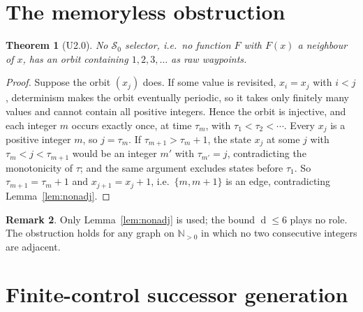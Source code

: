 \documentclass[11pt]{article}
\newtheorem{theorem}{Theorem}[section]
\theoremstyle{definition}
\newtheorem{remark}[theorem]{Remark}
\newcommand{\N}{\mathbb{N}}
\newcommand{\dist}{\operatorname{d}}
\begin{document}
\section{The memoryless obstruction}\label{sec:obstruction}
\begin{theorem}[U2.0]\label{thm:u20}
No $\mathcal S_0$ selector, i.e.\ no function $F$ with $F(x)$ a neighbour of $x$, has an orbit containing $1,2,3,\dots$ as raw waypoints.
\end{theorem}
\begin{proof} Suppose the orbit $(x_j)$ does. If some value is revisited, $x_i=x_j$ with $i<j$, determinism makes the orbit eventually periodic, so it takes only
finitely many values and cannot contain all positive integers. Hence the orbit is injective, and each integer $m$ occurs exactly once, at time $\tau_m$, with
$\tau_1<\tau_2<\cdots$. Every $x_j$ is a positive integer $m$, so $j=\tau_m$. If $\tau_{m+1}>\tau_m+1$, the state $x_j$ at some $j$ with $\tau_m<j<\tau_{m+1}$ would be an integer $m'$ with $\tau_{m'}=j$, contradicting the monotonicity of
$\tau$; and the same argument excludes states before $\tau_1$. So $\tau_{m+1}=\tau_m+1$ and $x_{j+1}=x_j+1$, i.e.\ $\{m,m+1\}$ is an edge, contradicting
Lemma~\ref{lem:nonadj}. \end{proof}
\begin{remark} Only Lemma~\ref{lem:nonadj} is used; the bound $\dist\le6$ plays no role. The obstruction holds for any graph on $\N_{>0}$ in which no two consecutive integers are adjacent.\end{remark}

\section{Finite-control successor generation}\label{sec:finite}
\end{document}
